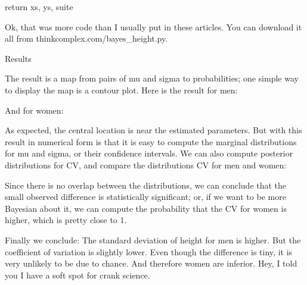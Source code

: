 \documentclass[12pt]{book}
\begin{document}
    return xs, ys, suite

Ok, that was more code than I usually put in these articles.  You can
download it all from thinkcomplex.com/bayes_height.py.

Results

The result is a map from pairs of mu and sigma to probabilities; one
simple way to display the map is a contour plot.  Here is the result
for men:


And for women:


As expected, the central location is near the estimated parameters.
But with this result in numerical form is that it is easy to compute
the marginal distributions for mu and sigma, or their confidence
intervals.  We can also compute posterior distributions for CV, and
compare the distributions CV for men and women:


Since there is no overlap between the distributions, we can conclude
that the small observed difference is statistically significant; or,
if we want to be more Bayesian about it, we can compute the
probability that the CV for women is higher, which is pretty close to
1.

Finally we conclude: The standard deviation of height for men is
higher.  But the coefficient of variation is slightly lower.  Even
though the difference is tiny, it is very unlikely to be due to
chance.  And therefore women are inferior.  Hey, I told you I have a
soft spot for crank science.
\end{document}
